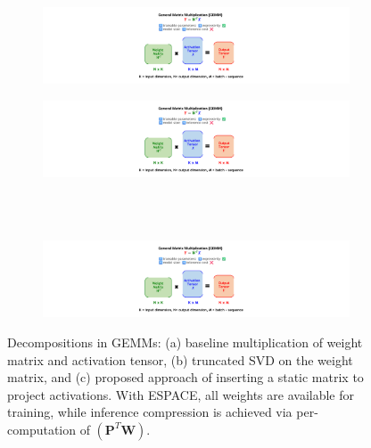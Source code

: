 \documentclass{article}
\theoremstyle{plain}
\begin{document}
\begin{figure}[!t]
\begin{center}
    \begin{subfigure}[t]{0.45\textwidth}
    \centering
        \includegraphics[trim=24cm 1cm 26.5cm 1cm, clip, width = 0.9\linewidth,page=1]{espace_paper_figures.pdf}
    \caption{}
    \end{subfigure}
    \begin{subfigure}[t]{0.45\textwidth}
    \centering
        \includegraphics[trim=23.5cm 0.5cm 26cm 0.5cm, clip, width = 0.9\linewidth,page=2]{espace_paper_figures.pdf}
    \caption{}
    \end{subfigure}\\~\\
    \begin{subfigure}[t]{0.99\textwidth}
    \centering
        \includegraphics[trim=3cm 1cm 4cm 0.5cm, clip, width = \linewidth,page=3]{espace_paper_figures.pdf}
    \caption{}
    \end{subfigure}
\end{center}
\caption{\footnotesize Decompositions in GEMMs: (a) baseline multiplication of weight matrix and activation tensor, (b) truncated SVD on the weight matrix, and (c) proposed approach of inserting a static matrix to project activations. With ESPACE, all weights are available for training, while inference compression is achieved via per-computation of $\left( \mathbf{P}^T \mathbf{W}\right)$.}
\label{fig:gemms}
\end{figure}
\end{document}
